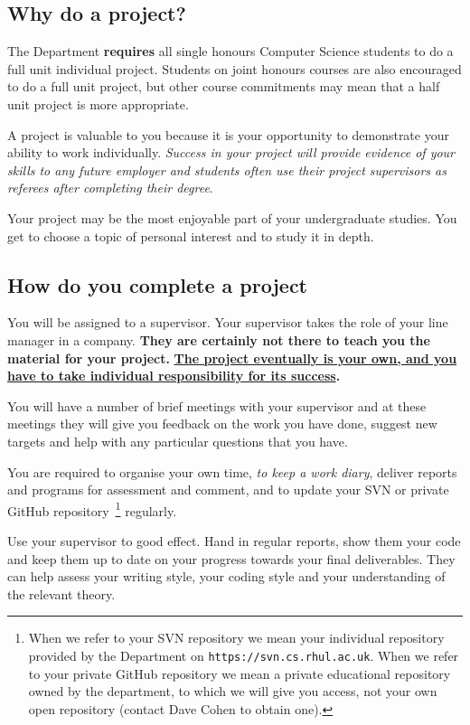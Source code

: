 \documentclass[11pt]{article}
\begin{document}
\subsection{Why do a project?}
The Department \textbf{requires} all single honours Computer Science students to do a full unit individual project.
Students on joint honours courses are also encouraged to do a full unit project, but other course commitments may mean that a half unit project is more appropriate.

A project is valuable to you because it is your opportunity to demonstrate your ability to work individually.  \textit{Success in your project will provide evidence of your skills to any future employer and students often use their project supervisors as referees after completing their degree}.

Your project may be the most enjoyable part of your undergraduate studies.  You get to choose a topic of personal interest and to study it in depth.

\subsection{How do you complete a project}
You will be assigned to a supervisor.  Your supervisor takes the role of your line manager in a company.  \textbf{They are certainly not there to teach you the material for your project.} \textbf{\uline{The project eventually is your own, and you have to take individual responsibility for its success}.}

You will have a number of brief meetings with your supervisor and at these meetings they will give you feedback on the work you have done, suggest new targets and help with any particular questions that you have.

You are required to organise your own time, \textit{to keep a work diary}, deliver reports and programs for assessment and comment, and to update your SVN or private GitHub repository~\footnote{When we refer to your SVN repository we mean your individual repository provided by the Department on \texttt{https://svn.cs.rhul.ac.uk}.  When we refer to your private GitHub repository we mean a private educational repository owned by the department, to which we will give you access, not your own open repository (contact Dave Cohen to obtain one).} regularly.

Use your supervisor to good effect.  Hand in regular reports, show them your code and keep them up to date on your progress towards your final deliverables.  They can help assess your writing style, your coding style and your understanding of the relevant theory.
\end{document}
